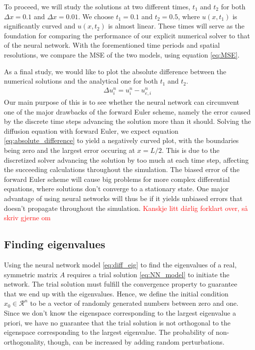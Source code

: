 \documentclass[12pt]{extarticle}
\begin{document}
To proceed, we will study the solutions at two different times, $t_1$ and $t_2$ for both $\Delta x = 0.1$ and $\Delta x = 0.01$. We choose $t_1=0.1$ and $t_2=0.5$, where $u(x,t_1)$ is significantly curved and $u(x,t_2)$ is almost linear. These times will serve as the foundation for comparing the performance of our explicit numerical solver to that of the neural network. With the forementioned time periods and spatial resolutions, we compare the MSE of the two models, using equation \eqref{eq:MSE}. 

As a final study, we would like to plot the absolute difference between the numerical solutions and the analytical one for both $t_1$ and $t_2$. 
\begin{align} \label{eq:absolute_difference}
	\Delta u_i^n = u_i^n - u_{e,i}^n
\end{align}
Our main purpose of this is to see whether the neural network can circumvent one of the major drawbacks of the forward Euler scheme, namely the error caused by the discrete time steps advancing the solution more than it should. Solving the diffusion equation with forward Euler, we expect equation \eqref{eq:absolute_difference} to yield a negatively curved plot, with the boundaries being zero and the largest error occuring at $x=L/2$. This is due to the discretized solver advancing the solution by too much at each time step, affecting the succeeding calculations throughout the simulation. The biased error of the forward Euler scheme will cause big problems for more complex differential equations, where solutions don't converge to a stationary state. One major advantage of using neural networks will thus be if it yields unbiased errors that doesn't propagate throughout the simulation. \textcolor{red}{Kanskje litt dårlig forklart over, så skriv gjerne om}



\subsection{Finding eigenvalues}
Using the neural network model \eqref{eq:diff_eig} to find the eigenvalues of a real, symmetric matrix $A$ requires a trial solution \eqref{eq:NN_model} to initiate the network. The trial solution must fulfill the convergence property to guarantee that we end up with the eigenvalues. Hence, we define the initial condition $x_0 \in \mathcal{R}^n$ to be a vector of randomly generated numbers between zero and one. Since we don't know the eigenspace corresponding to the largest eigenvalue a priori, we have no guarantee that the trial solution is not orthogonal to the eigenspace corresponding to the largest eigenvalue. The probability of non-orthogonality, though, can be increased by adding random perturbations.
\end{document}
